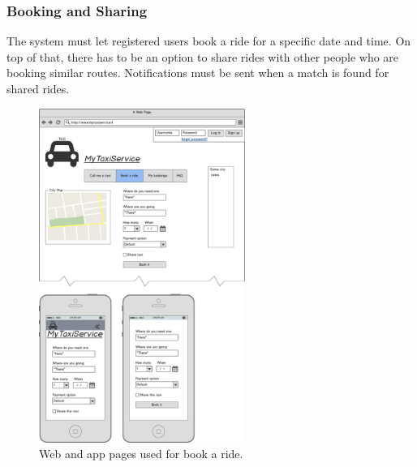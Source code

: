 		\subsubsection {Booking and Sharing}
			The system must let registered users book a ride for a specific date and time. On top of that, there has to be an option to share
			rides with other people who are booking similar routes. Notifications must be sent when a match is found for shared rides.
			\begin{figure}[!h]
				\includegraphics[width=0.6\textwidth]{mockup/bookride}
				\caption{Web and app pages used for book a ride.}
			\end{figure}
			\newpage
